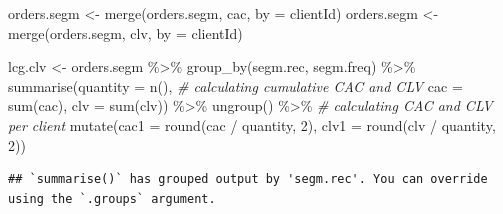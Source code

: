 \documentclass[
]{book}
\newenvironment{Shaded}{\begin{snugshade}}{\end{snugshade}}
\newcommand{\AttributeTok}[1]{\textcolor[rgb]{0.77,0.63,0.00}{#1}}
\newcommand{\CommentTok}[1]{\textcolor[rgb]{0.56,0.35,0.01}{\textit{#1}}}
\newcommand{\DecValTok}[1]{\textcolor[rgb]{0.00,0.00,0.81}{#1}}
\newcommand{\FunctionTok}[1]{\textcolor[rgb]{0.00,0.00,0.00}{#1}}
\newcommand{\NormalTok}[1]{#1}
\newcommand{\OtherTok}[1]{\textcolor[rgb]{0.56,0.35,0.01}{#1}}
\newcommand{\SpecialCharTok}[1]{\textcolor[rgb]{0.00,0.00,0.00}{#1}}
\newcommand{\StringTok}[1]{\textcolor[rgb]{0.31,0.60,0.02}{#1}}
\begin{document}
\begin{Shaded}
\begin{Highlighting}[]
\NormalTok{orders.segm }\OtherTok{\textless{}{-}} \FunctionTok{merge}\NormalTok{(orders.segm, cac, }\AttributeTok{by =} \StringTok{\textquotesingle{}clientId\textquotesingle{}}\NormalTok{)}
\NormalTok{orders.segm }\OtherTok{\textless{}{-}} \FunctionTok{merge}\NormalTok{(orders.segm, clv, }\AttributeTok{by =} \StringTok{\textquotesingle{}clientId\textquotesingle{}}\NormalTok{)}

\NormalTok{lcg.clv }\OtherTok{\textless{}{-}}\NormalTok{ orders.segm }\SpecialCharTok{\%\textgreater{}\%}
    \FunctionTok{group\_by}\NormalTok{(segm.rec, segm.freq) }\SpecialCharTok{\%\textgreater{}\%}
    \FunctionTok{summarise}\NormalTok{(}\AttributeTok{quantity =} \FunctionTok{n}\NormalTok{(),}
              \CommentTok{\# calculating cumulative CAC and CLV}
              \AttributeTok{cac =} \FunctionTok{sum}\NormalTok{(cac),}
              \AttributeTok{clv =} \FunctionTok{sum}\NormalTok{(clv)) }\SpecialCharTok{\%\textgreater{}\%}
    \FunctionTok{ungroup}\NormalTok{() }\SpecialCharTok{\%\textgreater{}\%}
    \CommentTok{\# calculating CAC and CLV per client}
    \FunctionTok{mutate}\NormalTok{(}\AttributeTok{cac1 =} \FunctionTok{round}\NormalTok{(cac }\SpecialCharTok{/}\NormalTok{ quantity, }\DecValTok{2}\NormalTok{),}
           \AttributeTok{clv1 =} \FunctionTok{round}\NormalTok{(clv }\SpecialCharTok{/}\NormalTok{ quantity, }\DecValTok{2}\NormalTok{))}
\end{Highlighting}
\end{Shaded}

\begin{verbatim}
## `summarise()` has grouped output by 'segm.rec'. You can override using the `.groups` argument.
\end{verbatim}
\end{document}

